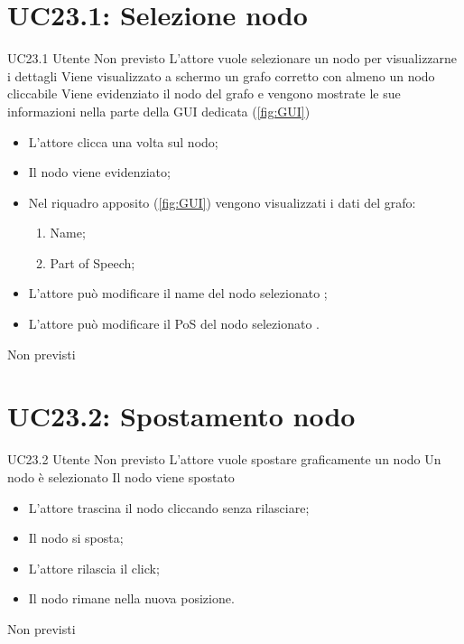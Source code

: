 \documentclass[../AnalisideiRequisiti.tex]{subfiles}
\begin{document}
\section{UC23.1: Selezione nodo}
\UserCase
{UC23.1}
{Utente}
{Non previsto}
{L'attore vuole selezionare un nodo per visualizzarne i dettagli}
{Viene visualizzato a schermo un grafo corretto con almeno un nodo cliccabile }
{Viene evidenziato il nodo del grafo e vengono mostrate le sue informazioni nella parte della GUI dedicata (\ref{fig:GUI})}
{
	\begin{itemize}
		\item{} L'attore clicca una volta sul nodo;
		\item{} Il nodo viene evidenziato;
		\item{} Nel riquadro apposito (\ref{fig:GUI}) vengono visualizzati i dati del grafo:
		\begin{enumerate}
			\item{} Name;
			\item{} Part of Speech;
		\end{enumerate}
		\item{} L'attore può modificare il name del nodo selezionato ;
		\item{} L'attore può modificare il PoS del nodo selezionato .
	\end{itemize}
}
{Non previsti}

\section{UC23.2: Spostamento nodo}
\UserCase
{UC23.2}
{Utente}
{Non previsto}
{L'attore vuole spostare graficamente un nodo}
{Un nodo è selezionato }
{Il nodo viene spostato}
{
	\begin{itemize}
		\item{} L'attore trascina il nodo cliccando senza rilasciare;
		\item{} Il nodo si sposta;
		\item{} L'attore rilascia il click;
		\item{} Il nodo rimane nella nuova posizione.
	\end{itemize}
}
{Non previsti}
\end{document}
